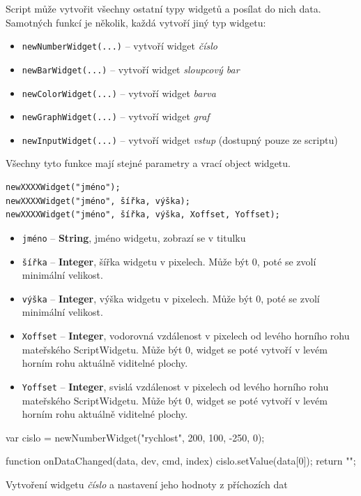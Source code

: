 \documentclass[12pt, a4paper, oneside]{article}
\newcommand{\It}{\textit}  %
\begin{document}
Script může vytvořit všechny ostatní typy widgetů a posílat do nich data. Samotných funkcí je několik, každá vytvoří jiný typ widgetu:
\begin{itemize}
    \item {\color{blue}\verb/newNumberWidget(...)/} -- vytvoří widget \It{číslo}
    \item {\color{blue}\verb/newBarWidget(...)/} -- vytvoří widget \It{sloupcový bar}
    \item {\color{blue}\verb/newColorWidget(...)/} -- vytvoří widget \It{barva}
    \item {\color{blue}\verb/newGraphWidget(...)/} -- vytvoří widget \It{graf}
    \item {\color{blue}\verb/newInputWidget(...)/} -- vytvoří widget \It{vstup} (dostupný pouze ze scriptu)
\end{itemize}

Všechny tyto funkce mají stejné parametry a vrací object widgetu.
{\color{blue}
\begin{verbatim}newXXXXWidget("jméno");
newXXXXWidget("jméno", šířka, výška);
newXXXXWidget("jméno", šířka, výška, Xoffset, Yoffset);
\end{verbatim}
}

\begin{itemize}
    \item \verb/jméno/ -- {\bf String}, jméno widgetu, zobrazí se v titulku
    \item \verb/šířka/ -- {\bf Integer}, šířka widgetu v pixelech. Může být 0, poté se zvolí minimální velikost.
    \item \verb/výška/ -- {\bf Integer}, výška widgetu v pixelech. Může být 0, poté se zvolí minimální velikost.
    \item \verb/Xoffset/ -- {\bf Integer}, vodorovná vzdálenost v pixelech od levého horního rohu mateřského ScriptWidgetu. Může být 0, widget se poté vytvoří v levém horním rohu aktuálně viditelné plochy.
     \item \verb/Yoffset/ -- {\bf Integer}, svislá vzdálenost v pixelech od levého horního rohu mateřského ScriptWidgetu. Může být 0, widget se poté vytvoří v levém horním rohu aktuálně viditelné plochy.
\end{itemize}

\begin{listing}[H]
\begin{jscode}
var cislo = newNumberWidget("rychlost", 200, 100, -250, 0);

function onDataChanged(data, dev, cmd, index) {
    cislo.setValue(data[0]);
    return "";
}
\end{jscode}
\caption{Vytvoření widgetu \It{číslo} a nastavení jeho hodnoty z příchozích dat}
\end{listing}
\end{document}
